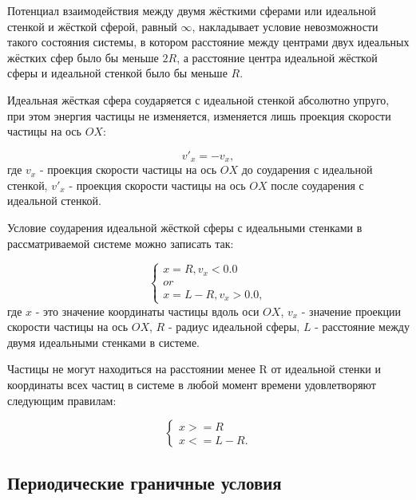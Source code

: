 \documentclass[a4paper]{article}
\begin{document}
Потенциал взаимодействия между двумя жёсткими сферами или идеальной стенкой и жёсткой сферой, равный $ \infty $, накладывает условие невозможности такого состояния системы, в котором расстояние между центрами двух идеальных жёстких сфер было бы меньше $ 2R $, а расстояние центра идеальной жёсткой сферы и идеальной стенкой было бы меньше $ R $.

Идеальная жёсткая сфера соударяется с идеальной стенкой абсолютно упруго, при этом энергия частицы не изменяется, изменяется лишь проекция скорости частицы на ось $ OX $:

\begin{equation}
    v'_x = -v_x,
\end{equation}
где $ v_x $ - проекция скорости частицы на ось $ OX $ до соударения с идеальной стенкой, $ v'_x $ - проекция скорости частицы на ось $ OX $ после соударения с идеальной стенкой.

Условие соударения идеальной жёсткой сферы с идеальными стенками в рассматриваемой системе можно записать так:

\begin{equation}\label{eq:condition_of_collision_with_ideal_wall}
    \begin{cases}
        x = R, v_x < 0.0
        \\
        or
        \\
        x = L - R, v_x > 0.0,
    \end{cases}
\end{equation}
где $ x $ - это значение координаты частицы вдоль оси $ OX $, $ v_x $ - значение проекции скорости частицы на ось $ OX $, $ R $ - радиус идеальной сферы, $ L $ - расстояние между двумя идеальными стенками в системе.

Частицы не могут находиться на расстоянии менее R от идеальной стенки и координаты всех частиц в системе в любой момент времени удовлетворяют следующим правилам:

\begin{equation}\label{eq:particles_and_ideal_wall}
    \begin{cases}
        x >= R
        \\
        x <= L - R.
    \end{cases}
\end{equation}


\subsection{Периодические граничные условия}
\end{document}
